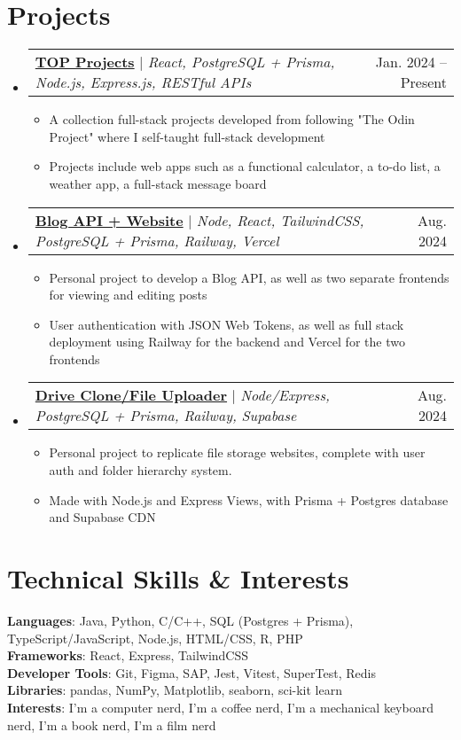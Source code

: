 \documentclass[letterpaper,11pt]{article}
\makeatletter
\newcommand{\resumeItem}[1]{
  \item\small{
    {#1 \vspace{-2pt}}
  }
}
\newcommand{\resumeProjectHeading}[2]{
    \item
    \begin{tabular*}{0.97\textwidth}{l@{\extracolsep{\fill}}r}
      \small#1 & #2 \\
    \end{tabular*}\vspace{-7pt}
}
\newcommand{\resumeSubHeadingListStart}{\begin{itemize}[leftmargin=0.15in, label={}]}
\newcommand{\resumeSubHeadingListEnd}{\end{itemize}}
\newcommand{\resumeItemListStart}{\begin{itemize}}
\newcommand{\resumeItemListEnd}{\end{itemize}\vspace{-5pt}}
\makeatother
\begin{document}
\section{Projects}
    \resumeSubHeadingListStart
      \resumeProjectHeading
        {\textbf{\href{https://safarinexus.github.io/odin_projects/}{TOP Projects}} $|$ \emph{React, PostgreSQL + Prisma, Node.js, Express.js, RESTful APIs}}{Jan. 2024 -- Present}
          \resumeItemListStart
          \resumeItem{A collection full-stack projects developed from following "The Odin Project" where I self-taught full-stack development}
          \resumeItem{Projects include web apps such as a functional calculator, a to-do list, a weather app, a full-stack message board}
          \resumeItemListEnd
      \resumeProjectHeading
        {\textbf{\href{https://edgr-odin-blog-access.vercel.app/}{Blog API + Website}} $|$ \emph{Node, React, TailwindCSS, PostgreSQL + Prisma, Railway, Vercel}}{Aug. 2024}
          \resumeItemListStart
            \resumeItem{Personal project to develop a Blog API, as well as two separate frontends for viewing and editing posts}
            \resumeItem{User authentication with JSON Web Tokens, as well as full stack deployment using Railway for the backend and Vercel for the two frontends}
          \resumeItemListEnd
        \resumeProjectHeading
      {\textbf{\href{https://odin-file-uploader-production-11ed.up.railway.app/}{Drive Clone/File Uploader}} $|$ \emph{Node/Express, PostgreSQL + Prisma, Railway, Supabase}}{Aug. 2024}
        \resumeItemListStart
          \resumeItem{Personal project to replicate file storage websites, complete with user auth and folder hierarchy system.}
          \resumeItem{Made with Node.js and Express Views, with Prisma + Postgres database and Supabase CDN}
        \resumeItemListEnd
    \resumeSubHeadingListEnd



%
\section{Technical Skills \& Interests}
 \begin{itemize}[leftmargin=0.15in, label={}]
    \small{\item{
     \textbf{Languages}{: Java, Python, C/C++, SQL (Postgres + Prisma), TypeScript/JavaScript, Node.js, HTML/CSS, R, PHP} \\
     \textbf{Frameworks}{: React, Express, TailwindCSS} \\
     \textbf{Developer Tools}{: Git, Figma, SAP, Jest, Vitest, SuperTest, Redis} \\
     \textbf{Libraries}{: pandas, NumPy, Matplotlib, seaborn, sci-kit learn} \\
     \textbf{Interests}{: I’m a computer nerd, I’m a coffee nerd, I’m a mechanical keyboard nerd, I’m a book nerd, I’m a film nerd}
    }}
 \end{itemize}


\end{document}
